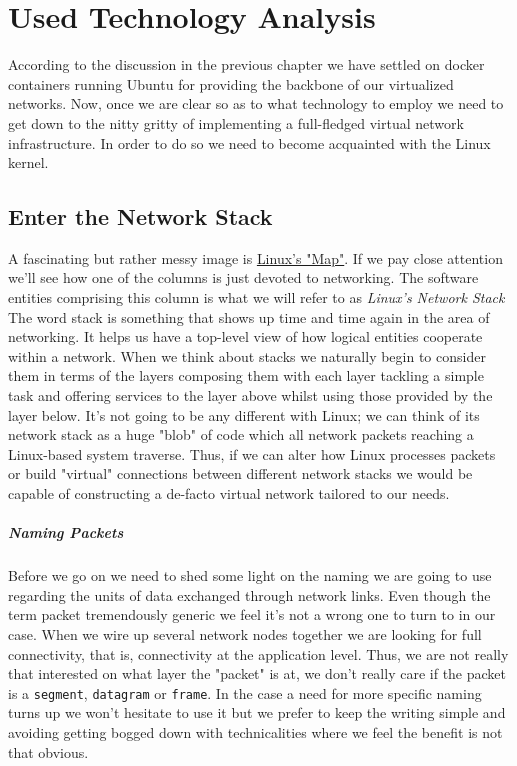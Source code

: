 \chapter{Used Technology Analysis}
    According to the discussion in the previous chapter we have settled on docker containers running Ubuntu for providing the backbone of our virtualized networks. Now, once we are clear so as to what technology to employ we need to get down to the nitty gritty of implementing a full-fledged virtual network infrastructure. In order to do so we need to become acquainted with the Linux kernel.

    \section{Enter the Network Stack}
        A fascinating but rather messy image is \href{https://upload.wikimedia.org/wikipedia/commons/5/5b/Linux_kernel_map.png}{Linux's "Map"}. If we pay close attention we'll see how one of the columns is just devoted to networking. The software entities comprising this column is what we will refer to as \textit{Linux's Network Stack}\\

         The word stack is something that shows up time and time again in the area of networking. It helps us have a top-level view of how logical entities cooperate within a network. When we think about stacks we naturally begin to consider them in terms of the layers composing them with each layer tackling a simple task and offering services to the layer above whilst using those provided by the layer below. It's not going to be any different with Linux; we can think of its network stack as a huge "blob" of code which all network packets reaching a Linux-based system traverse. Thus, if we can alter how Linux processes packets or build "virtual" connections between different network stacks we would be capable of constructing a de-facto virtual network tailored to our needs.\\

         \paragraph{Naming Packets}
            Before we go on we need to shed some light on the naming we are going to use regarding the units of data exchanged through network links. Even though the term packet tremendously generic we feel it's not a wrong one to turn to in our case. When we wire up several network nodes together we are looking for full connectivity, that is, connectivity at the application level. Thus, we are not really that interested on what layer the "packet" is at, we don't really care if the packet is a \texttt{segment}, \texttt{datagram} or \texttt{frame}. In the case a need for more specific naming turns up we won't hesitate to use it but we prefer to keep the writing simple and avoiding getting bogged down with technicalities where we feel the benefit is not that obvious.

